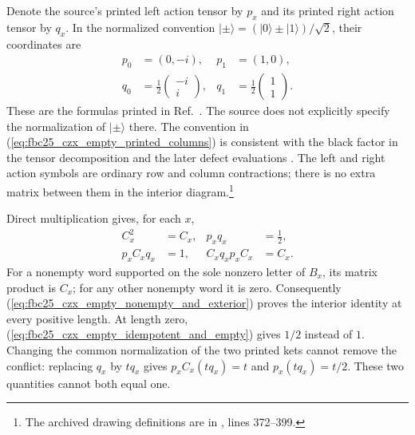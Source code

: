 \documentclass{article}
\begin{document}
Denote the source's printed left action tensor by $p_x$ and its printed
right action tensor by $q_x$. In the normalized convention
$|\pm\rangle=(|0\rangle\pm|1\rangle)/\sqrt2$, their coordinates are
\begin{align}
    p_0 & =(0,-i),                                   & p_1                                       & =(1,0),
    \label{eq:fbc25_czx_empty_printed_rows}                                                                \\
    q_0 & =\frac12\begin{pmatrix}-i\\i\end{pmatrix},
        & q_1                                        & =\frac12\begin{pmatrix}1\\1\end{pmatrix}.
    \label{eq:fbc25_czx_empty_printed_columns}
\end{align}
These are the formulas printed in
Ref.~\cite[lines~4690--4694]{FrancoRubio2025MPUGauging}. The source does not
explicitly specify the normalization of $|\pm\rangle$ there. The convention
in (\ref{eq:fbc25_czx_empty_printed_columns}) is consistent with the black
factor in the tensor decomposition and the later defect evaluations
\cite[lines~4589--4601 and 4800--4859]{FrancoRubio2025MPUGauging}.
The left and right action symbols are ordinary row and column contractions;
there is no extra matrix between them in the interior diagram.\footnote{The
    archived drawing definitions are in ,
    lines 372--399.}

Direct multiplication gives, for each $x$,
\begin{align}
    C_x^2     & =C_x, & p_xq_x       & =\frac12,
    \label{eq:fbc25_czx_empty_idempotent_and_empty} \\
    p_xC_xq_x & =1,   & C_xq_xp_xC_x & =C_x.
    \label{eq:fbc25_czx_empty_nonempty_and_exterior}
\end{align}
For a nonempty word supported on the sole nonzero letter of $B_x$, its
matrix product is $C_x$; for any other nonempty word it is zero. Consequently
(\ref{eq:fbc25_czx_empty_nonempty_and_exterior}) proves the interior
identity at every positive length. At length zero,
(\ref{eq:fbc25_czx_empty_idempotent_and_empty}) gives $1/2$ instead of $1$.
Changing the common normalization of the two printed kets cannot remove the
conflict: replacing $q_x$ by $tq_x$ gives $p_xC_x(tq_x)=t$ and
$p_x(tq_x)=t/2$. These two quantities cannot both equal one.
\end{document}
